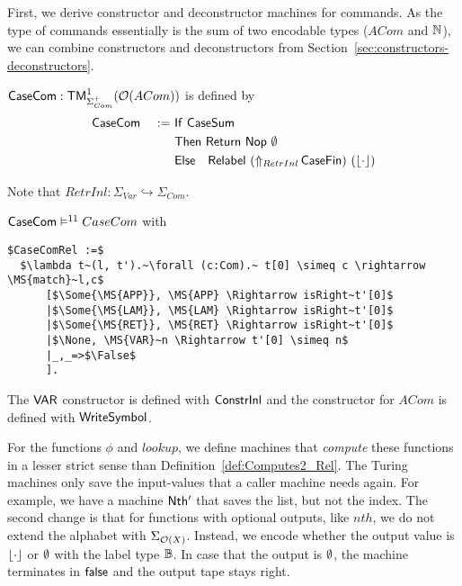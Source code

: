 First, we derive constructor and deconstructor machines for commands.  As the type of commands essentially is the sum of two encodable types ($ACom$
and $\Nat$), we can combine constructors and deconstructors from Section~\ref{sec:constructors-deconstructors}.
%
\begin{definition}[$\MS{CaseCom}$][CaseTok]
  $\MS{CaseCom} : \TM_{\Sigma^+_{Com}}^1(\Option(ACom))$ is defined by
  \begin{alignat*}{2}
    & \MS{CaseCom} &~:=~& \MS{If}~\MS{CaseSum} \\
    &               &    & \MS{Then}~   \Return{\Nop}{\None} \\
    &               &    & \MS{Else}~~~ \MS{Relabel}~(\LiftAlphabet{\MS{CaseFin}}{RetrInl})~(\Some\cdot)
  \end{alignat*}
\end{definition}
Note that $RetrInl : \Sigma_{Var} \hookrightarrow \Sigma_{Com}$.
\begin{lemma}
  \label{lem:CaseCom_Sem}
  $\MS{CaseCom} \RealiseIn{11} CaseCom$ with
\begin{lstlisting}[style=semicoqstyle]
$CaseComRel :=$
  $\lambda t~(l, t').~\forall (c:Com).~ t[0] \simeq c \rightarrow \MS{match}~l,c$
      [$\Some{\MS{APP}}, \MS{APP} \Rightarrow isRight~t'[0]$
      |$\Some{\MS{LAM}}, \MS{LAM} \Rightarrow isRight~t'[0]$
      |$\Some{\MS{RET}}, \MS{RET} \Rightarrow isRight~t'[0]$
      |$\None, \MS{VAR}~n \Rightarrow t'[0] \simeq n$
      |_,_=>$\False$
      ].
\end{lstlisting}
\end{lemma}
The $\MS{VAR}$ constructor is defined with $\MS{ConstrInl}$ and the constructor for $ACom$ is defined with $\MS{WriteSymbol}$.

For the functions $\phi$ and $lookup$, we define machines that \textit{compute} these functions in a lesser strict sense than
Definition~\ref{def:Computes2_Rel}.  The Turing machines only save the input-values that a caller machine needs again.  For example, we have a machine
$\MS{Nth'}$ that saves the list, but not the index.  The second change is that for functions with optional outputs, like $nth$, we do not extend the
alphabet with $\Sigma_{\Option(X)}$.  Instead, we encode whether the output value is $\Some{\cdot}$ or $\None$ with the label type $\Bool$.  In case
that the output is $\None$, the machine terminates in $\false$ and the output tape stays right.

